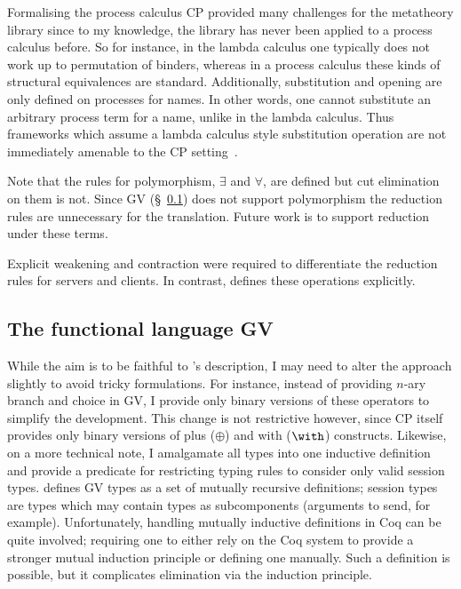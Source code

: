\documentclass{mpaper}
\begin{document}
Formalising the process calculus CP provided many challenges for the
metatheory library since to my knowledge, the library has never been applied
to a process calculus before. So for instance, in the lambda calculus one
typically does not work up to permutation of binders, whereas in a process
calculus these kinds of structural equivalences are standard. Additionally,
substitution and opening are only defined on processes for names. In other
words, one cannot substitute an arbitrary process term for a name, unlike in
the lambda calculus. Thus frameworks which assume a lambda calculus style
substitution operation are not immediately amenable to the CP
setting~\cite{Lee:2012}.

Note that the rules for polymorphism, $\exists$ and $\forall$, are defined but
cut elimination on them is not. Since GV (\S~\ref{sec:gv}) does not support
polymorphism the reduction rules are unnecessary for the translation. Future
work is to support reduction under these terms.

Explicit weakening and contraction were required to differentiate the
reduction rules for servers and clients. In contrast, \citeauthor{Wadler:2014}
defines these operations explicitly.

\subsection{The functional language GV}\label{sec:gv}

\begin{comment}
FIGURES

types

terms

typing judgements
\end{comment}

While the aim is to be faithful to \citeauthor{Wadler:2014}'s description, I
may need to alter the approach slightly to avoid tricky formulations. For
instance, instead of providing $n$-ary branch and choice in GV, I provide
only binary versions of these operators to simplify the development. This
change is not restrictive however, since CP itself provides only binary
versions of plus ($\oplus$) and with ($\with$) constructs. Likewise, on a more
technical note, I amalgamate all types into one inductive definition and
provide a predicate for restricting typing rules to consider only valid
session types. \citeauthor{Wadler:2014} defines GV types as a set of mutually
recursive definitions; session types are types which may contain types as
subcomponents (arguments to send, for example). Unfortunately, handling
mutually inductive definitions in Coq can be quite involved; requiring one to
either rely on the Coq system to provide a stronger mutual induction principle
or defining one manually. Such a definition is possible, but it complicates
elimination via the induction principle.
\end{document}
